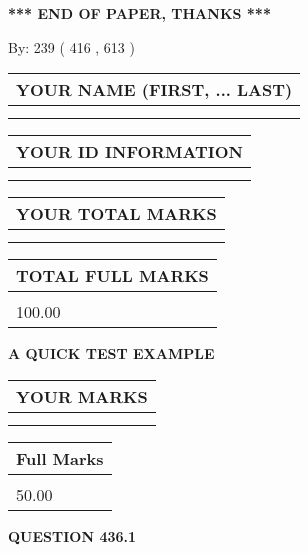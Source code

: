 \documentclass[12pt]{article}
\begin{document}
\vspace{1.0in} 
{\textbf{\large{ *** END OF PAPER, THANKS *** }}} 
   
   
\hspace{1.0in} By: 
 239 ( 416 ,  613 )
   
   
   
   
\newpage 
\setcounter{page}{ 
   436001 } 
   
   
   
   
\noindent\begin{tabular}{|l|}
\hline
YOUR NAME (FIRST, ... LAST)  \\
\hline
 \\ 
 \\ 
\hline
\end{tabular}
\hspace{0.05in} \begin{tabular}{|l|}
\hline
 YOUR   ID   INFORMATION  \\
\hline
 \\ 
 \\ 
\hline
\end{tabular}
   
   
\vspace{0.2in}\noindent\begin{tabular}{|l|}
\hline
YOUR TOTAL MARKS  \\
\hline
 \\ 
 \\ 
\hline
\end{tabular}
\hspace{0.05in} \begin{tabular}{|l|}
\hline
TOTAL FULL MARKS  \\
\hline
 \\ 
100.00 \\
\hline
\end{tabular}
   
   
 \vspace{0.2in}
{\LARGE {\textbf{ A QUICK TEST EXAMPLE}}}
   
   
  
\vspace{0.2in}
  
\noindent\begin{tabular}{|l|}
\hline
 YOUR MARKS  \\
\hline
 \\ 
 \\ 
\hline
\end{tabular}
\hspace{0.05in} \begin{tabular}{|l|}
\hline
 Full Marks  \\
\hline
 \\ 
50.00 \\
\hline
\end{tabular}
{\textbf{\Large{QUESTION
436.1 
}}}
  
\end{document}
